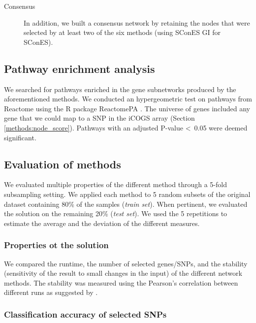 \documentclass[twocolumn, 11pt]{article}
\begin{document}
\begin{description}
\item[{Consensus}] In addition, we built a consensus network by retaining the nodes that were selected by at least two of the six methods (using SConES GI for SConES).
\end{description}

\subsection{Pathway enrichment analysis}
\label{methods:pathway_enrichment}

We searched for pathways enriched in the gene subnetworks produced by the aforementioned methods. We conducted an hypergeometric test on pathways from Reactome \cite{Jassal2019} using the R package ReactomePA \cite{Yu2016}. The universe of genes included any gene that we could map to a SNP in the iCOGS array (Section \ref{methods:node_score}). Pathways with an adjusted P-value \textless~0.05 were deemed significant.

\subsection{Evaluation of methods}
\label{methods:comparison}

We evaluated multiple properties of the different method through a 5-fold subsampling setting. We applied each method to 5 random subsets of the original dataset containing 80\% of the samples (\emph{train set}). When pertinent, we evaluated the solution on the remaining 20\% (\emph{test set}). We used the 5 repetitions to estimate the average and the deviation of the different measures.

\subsubsection{Properties ot the solution}
\label{methods:algorithm_comparison}

We compared the runtime, the number of selected genes/SNPs, and the stability (sensitivity of the result to small changes in the input) of the different network methods. The stability was measured using the Pearson's correlation between different runs as suggested by \citet{nogueira_measuring_2016}.

\subsubsection{Classification accuracy of selected SNPs}
\label{methods:classifier}
\end{document}
